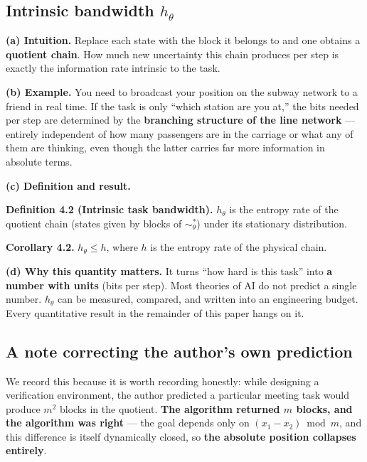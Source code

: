 \documentclass[11pt]{article}
\renewenvironment{quote}
  {\def\FrameCommand{{\color{gray!60}\vrule width 2pt}\hspace{8pt}}%
   \MakeFramed{\advance\hsize-\width \FrameRestore}\begin{itshape}}
  {\end{itshape}\endMakeFramed}
\begin{document}
\hypertarget{intrinsic-bandwidth-h_theta}{%
\subsection{\texorpdfstring{Intrinsic bandwidth \(h_\theta\)}{Intrinsic bandwidth h\_\textbackslash theta}}\label{intrinsic-bandwidth-h_theta}}

\textbf{(a) Intuition.} Replace each state with the block it belongs to and one obtains a \textbf{quotient chain}. How much new uncertainty this chain produces per step is exactly the information rate intrinsic to the task.

\textbf{(b) Example.} You need to broadcast your position on the subway network to a friend in real time. If the task is only ``which station are you at,'' the bits needed per step are determined by the \textbf{branching structure of the line network} --- entirely independent of how many passengers are in the carriage or what any of them are thinking, even though the latter carries far more information in absolute terms.

\textbf{(c) Definition and result.}

\begin{quote}
\textbf{Definition 4.2 (Intrinsic task bandwidth).} \(h_\theta\) is the entropy rate of the quotient chain (states given by blocks of \(\sim_\theta^*\)) under its stationary distribution.
\end{quote}

\begin{quote}
\textbf{Corollary 4.2.} \(h_\theta\le h\), where \(h\) is the entropy rate of the physical chain.
\end{quote}

\textbf{(d) Why this quantity matters.} It turns ``how hard is this task'' into \textbf{a number with units} (bits per step). Most theories of AI do not predict a single number. \(h_\theta\) can be measured, compared, and written into an engineering budget. Every quantitative result in the remainder of this paper hangs on it.

\hypertarget{a-note-correcting-the-authors-own-prediction}{%
\subsection{A note correcting the author's own prediction}\label{a-note-correcting-the-authors-own-prediction}}

We record this because it is worth recording honestly: while designing a verification environment, the author predicted a particular meeting task would produce \(m^2\) blocks in the quotient. \textbf{The algorithm returned \(m\) blocks, and the algorithm was right} --- the goal depends only on \((x_1-x_2)\bmod m\), and this difference is itself dynamically closed, so \textbf{the absolute position collapses entirely}.
\end{document}
